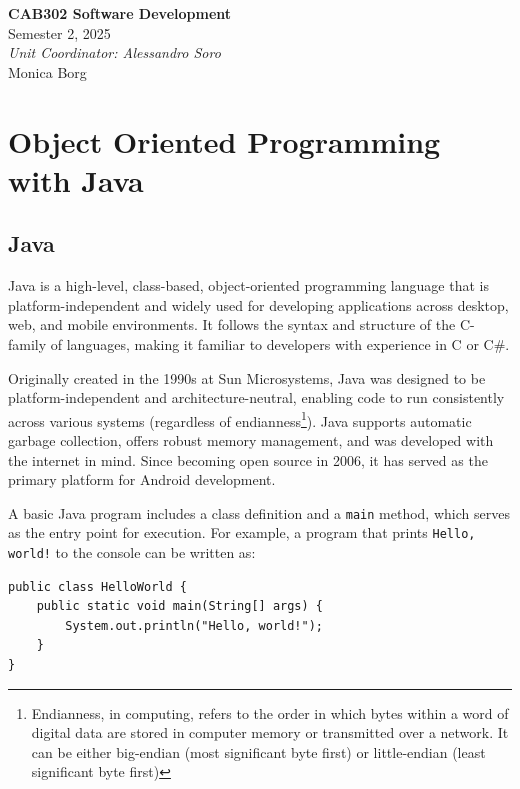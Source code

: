 \documentclass{article}
\date{}
\newcommand{\codecmd}[1]{\textcolor[rgb]{0,0.5,0}{\texttt{#1}}}
\newcommand{\unitName}{CAB302 Software Development}
\newcommand{\unitTime}{Semester 2, 2025}
\newcommand{\unitCoordinator}{Unit Coordinator: Alessandro Soro}
\newcommand{\documentAuthors}{Monica Borg}
\begin{document}
%
\begin{titlepage}
    \vspace*{\fill}
    \begin{center}
        \LARGE{\textbf{\unitName}} \\[0.1in]
        \normalsize{\unitTime} \\[0.2in]
        \normalsize\textit{\unitCoordinator} \\[0.2in]
        \documentAuthors
    \end{center}
    \vspace*{\fill}
    \thispagestyle{empty}
\end{titlepage}
\newpage
%
\tableofcontents
\newpage
%
\section{Object Oriented Programming with Java}

\subsection{Java}
Java is a high-level, class-based, object-oriented programming language that is platform-independent and widely used for developing applications across desktop, web, and mobile environments. It follows the syntax and structure of the C-family of languages, making it familiar to developers with experience in C or C\#.

Originally created in the 1990s at Sun Microsystems, Java was designed to be platform-independent and architecture-neutral, enabling code to run consistently across various systems (regardless of endianness\footnote{Endianness, in computing, refers to the order in which bytes within a word of digital data are stored in computer memory or transmitted over a network. It can be either big-endian (most significant byte first) or little-endian (least significant byte first)}). Java supports automatic garbage collection, offers robust memory management, and was developed with the internet in mind. Since becoming open source in 2006, it has served as the primary platform for Android development.

A basic Java program includes a class definition and a \codecmd{main} method, which serves as the entry point for execution. For example, a program that prints \codecmd{Hello, world!} to the console can be written as:

\begin{verbatim}
public class HelloWorld {
    public static void main(String[] args) {
        System.out.println("Hello, world!");
    }
}
\end{verbatim}
\end{document}
